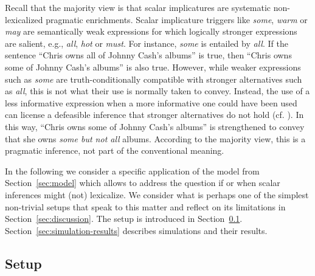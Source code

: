\documentclass[a4paper, 11pt]{article}
\theoremstyle{Satz}
\begin{document}
Recall that the majority view is that scalar implicatures are systematic non-lexicalized pragmatic
enrichments. Scalar implicature triggers like \emph{some}, \emph{warm} or \emph{may} are
semantically weak expressions for which logically stronger expressions are salient, e.g.,
\emph{all}, \emph{hot} or \emph{must}. For instance, {\em some} is entailed by {\em all}. If
the sentence ``Chris owns all of Johnny Cash's albums'' is true, then ``Chris owns some of
Johnny Cash's albums'' is also true. However, while weaker expressions such as {\em some} are
truth-conditionally compatible with stronger alternatives such as {\em all}, this is not what
their use is normally taken to convey. Instead, the use of a less informative expression when a
more informative one could have been used can license a defeasible inference that stronger
alternatives do not hold (cf. \citealt{horn:1972,gazdar:1979}). In this way, ``Chris owns some
of Johnny Cash's albums'' is strengthened to convey that she owns {\em some but not all}
albums. According to the majority view, this is a pragmatic inference, not part of the
conventional meaning.

In the following we consider a specific application of the model from Section~\ref{sec:model}
which allows to address the question if or when scalar inferences might (not) lexicalize. We
consider what is perhaps one of the simplest non-trivial setups that speak to this matter and
reflect on its limitations in Section~\ref{sec:discussion}. The setup is introduced in
Section~\ref{sec:setup:-stat-conc}. Section~\ref{sec:simulation-results} describes simulations
and their results.



\subsection{Setup}
\label{sec:setup:-stat-conc}
\end{document}

